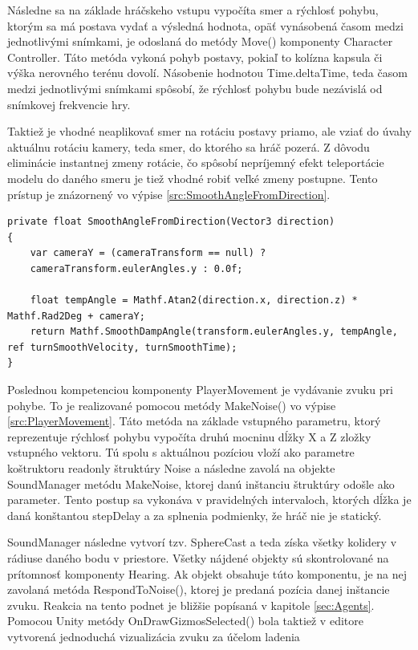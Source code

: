 \documentclass[slovak, master]{diploma}
\begin{document}
Následne sa na základe hráčskeho vstupu vypočíta smer a rýchlosť pohybu, ktorým sa má postava vydať a výsledná hodnota, opäť vynásobená časom medzi jednotlivými snímkami, je odoslaná do metódy Move() komponenty Character Controller. Táto metóda vykoná pohyb postavy, pokiaľ to kolízna kapsula či výška nerovného terénu dovolí. Násobenie hodnotou Time.deltaTime, teda časom medzi jednotlivými snímkami spôsobí, že rýchlosť pohybu bude nezávislá od snímkovej frekvencie hry.

Taktiež je vhodné neaplikovať smer na rotáciu postavy priamo, ale vziať do úvahy aktuálnu rotáciu kamery, teda smer, do ktorého sa hráč pozerá. Z dôvodu eliminácie instantnej zmeny rotácie, čo spôsobí nepríjemný efekt teleportácie modelu do daného smeru je tiež vhodné robiť veľké zmeny postupne. Tento prístup je znázornený vo výpise \ref{src:SmoothAngleFromDirection}.

\vspace{8pt}
\begin{lstlisting}[label=src:SmoothAngleFromDirection,caption={Postupná zmena rotácie postavy v súlade s rotáciu kamery}]
private float SmoothAngleFromDirection(Vector3 direction)
{
    var cameraY = (cameraTransform == null) ? 
    cameraTransform.eulerAngles.y : 0.0f;

    float tempAngle = Mathf.Atan2(direction.x, direction.z) * Mathf.Rad2Deg + cameraY;
    return Mathf.SmoothDampAngle(transform.eulerAngles.y, tempAngle, ref turnSmoothVelocity, turnSmoothTime);
}
\end{lstlisting}

Poslednou kompetenciou komponenty PlayerMovement je vydávanie zvuku pri pohybe. To je realizované pomocou metódy MakeNoise() vo výpise \ref{src:PlayerMovement}. Táto metóda na základe vstupného parametru, ktorý reprezentuje rýchlosť pohybu vypočíta druhú mocninu dĺžky X a Z zložky vstupného vektoru. Tú spolu s aktuálnou pozíciou vloží ako parametre koštruktoru readonly štruktúry Noise a následne zavolá na objekte SoundManager metódu MakeNoise, ktorej danú inštanciu štruktúry odošle ako parameter. Tento postup sa vykonáva v pravidelných intervaloch, ktorých dĺžka je daná konštantou stepDelay a za splnenia podmienky, že hráč nie je statický. 

SoundManager následne vytvorí tzv. SphereCast a teda získa všetky kolidery v rádiuse daného bodu v priestore. Všetky nájdené objekty sú skontrolované na prítomnosť komponenty Hearing. Ak objekt obsahuje túto komponentu, je na nej zavolaná metóda RespondToNoise(), ktorej je predaná pozícia danej inštancie zvuku. Reakcia na tento podnet je bližšie popísaná v kapitole \ref{sec:Agents}. Pomocou Unity metódy OnDrawGizmosSelected() bola taktiež v editore vytvorená jednoduchá vizualizácia zvuku za účelom ladenia
\end{document}
